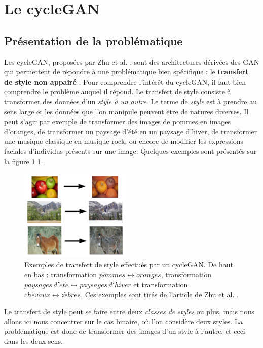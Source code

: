 \chapter{Le cycleGAN}

\section{Présentation de la problématique}


Les cycleGAN, proposées par Zhu et al. \cite{zhu_unpaired_2018}, sont des architectures dérivées des GAN qui permettent de répondre à une problématique bien spécifique : le \textbf{transfert de style non appairé} \cite{gatys_image_2016}. Pour comprendre l’intérêt du cycleGAN, il faut bien comprendre le problème auquel il répond.
Le transfert de style consiste à transformer des données d'un \textit{style à un autre}. Le terme de \textit{style} est à prendre au sens large et les données que l'on manipule peuvent être de natures diverses. Il peut s'agir par exemple de transformer des images de pommes en images d'oranges, de transformer un paysage d'été en un paysage d'hiver, de transformer une musique classique en musique rock, ou encore de modifier les expressions faciales d'individus présents sur une image. Quelques exemples sont présentés sur la figure \ref{cycle_exemples}.

\begin{figure}[!h]
\centering
\includegraphics[width=150pt,valign=t]{"images/cycle/cycle_exemples"}
\caption{Exemples de transfert de style effectués par un cycleGAN. De haut en bas : transformation $pommes \leftrightarrow oranges$, transformation $paysages \, d'\acute{e} t \acute{e} \leftrightarrow paysages\,d'hiver$ et transformation $chevaux \leftrightarrow z\grave{e}bres$. Ces exemples sont tirés de l'article de Zhu et al. \cite{zhu_unpaired_2018}.}
\label{cycle_exemples}
\end{figure}


Le transfert de style peut se faire entre deux \textit{classes de styles} ou plus, mais nous allons ici nous concentrer sur le cas binaire, où l'on considère deux styles. La problématique est donc de transformer des images d'un style à l'autre, et ceci dans les deux sens.

